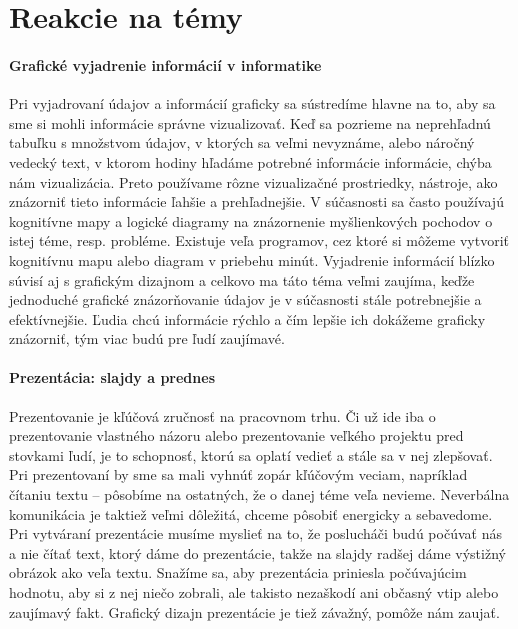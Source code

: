 \documentclass[10pt,slovak,a4paper]{article}
\begin{document}
\section{Reakcie na témy} \label{reakcie}

\paragraph{Grafické vyjadrenie informácií v informatike}
Pri vyjadrovaní údajov a informácií graficky sa sústredíme hlavne na to, aby sa sme si mohli informácie správne vizualizovať. Keď sa pozrieme na neprehľadnú tabuľku s množstvom údajov, v ktorých sa veľmi nevyznáme, alebo náročný vedecký text, v ktorom hodiny hľadáme potrebné informácie informácie, chýba nám vizualizácia. Preto používame rôzne vizualizačné prostriedky, nástroje, ako znázorniť tieto informácie ľahšie a prehľadnejšie. V súčasnosti sa často používajú kognitívne mapy a logické diagramy na znázornenie myšlienkových pochodov o istej téme, resp. probléme. Existuje veľa programov, cez ktoré si môžeme vytvoriť kognitívnu mapu alebo diagram v priebehu minút. Vyjadrenie informácií blízko súvisí aj s grafickým dizajnom a celkovo ma táto téma veľmi zaujíma, keďže jednoduché grafické znázorňovanie údajov je v súčasnosti stále potrebnejšie a efektívnejšie. Ľudia chcú informácie rýchlo a čím lepšie ich dokážeme graficky znázorniť, tým viac budú pre ľudí zaujímavé.

\paragraph{Prezentácia: slajdy a prednes}
Prezentovanie je kľúčová zručnosť na pracovnom trhu. Či už ide iba o prezentovanie vlastného názoru alebo prezentovanie veľkého projektu pred stovkami ľudí, je to schopnosť, ktorú sa oplatí vedieť a stále sa v nej zlepšovať. Pri prezentovaní by sme sa mali vyhnúť zopár kľúčovým veciam, napríklad čítaniu textu – pôsobíme na ostatných, že o danej téme veľa nevieme. Neverbálna komunikácia je taktiež veľmi dôležitá, chceme pôsobiť energicky a sebavedome. Pri vytváraní prezentácie musíme myslieť na to, že poslucháči budú počúvať nás a nie čítať text, ktorý dáme do prezentácie, takže na slajdy radšej dáme výstižný obrázok ako veľa textu. Snažíme sa, aby prezentácia priniesla počúvajúcim hodnotu, aby si z nej niečo zobrali, ale takisto nezaškodí ani občasný vtip alebo zaujímavý fakt. Grafický dizajn prezentácie je tiež závažný, pomôže nám zaujať.
\end{document}
